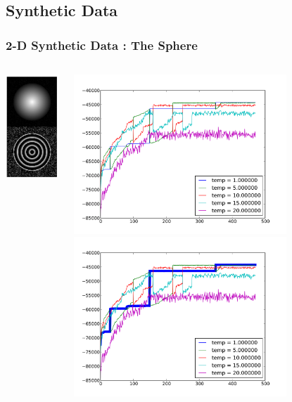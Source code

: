 \documentclass[compress]{beamer}
\begin{document}
\subsection{Synthetic Data}
\begin{frame}
  \frametitle{2-D Synthetic Data : The Sphere}
  \begin{columns}
    \begin{column}{3cm}
      \includegraphics[width=3cm]{sphere2_128_image}
    \end{column}
    
    \begin{column}{8cm}
       {
        \includegraphics[width=8cm]{sphere2_128_all_loglikelihood}
      }
       {
        \includegraphics[width=8cm]{sphere2_128_all_loglikelihood_highlight}
      }
    \end{column}
  \end{columns}

\end{frame}
\end{document}
